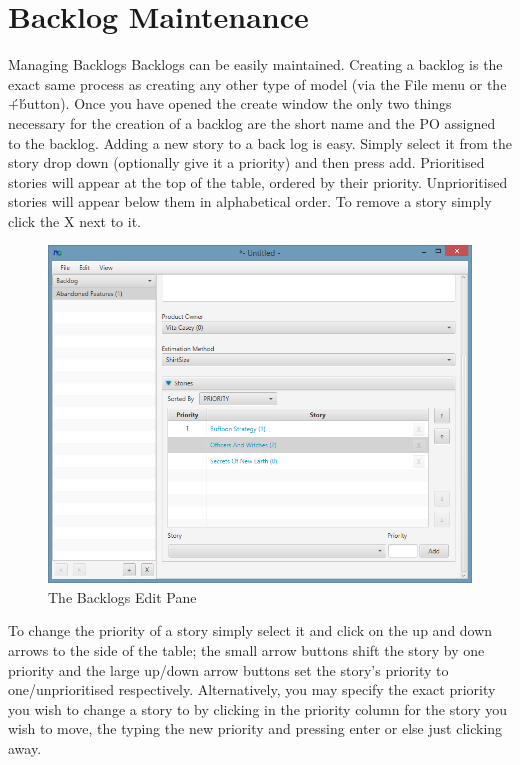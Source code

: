 \section{Backlog Maintenance}

Managing Backlogs
\newline\newline
Backlogs can be easily maintained. Creating a backlog is the exact same process as creating any other type of model (via the File menu or the \'+\' button). Once you have opened the create window the only two things necessary for the creation of a backlog are the short name and the PO assigned to the backlog.
\newline
Adding a new story to a back log is easy. Simply select it from the story drop down (optionally give it a priority) and then press add. Prioritised stories will appear at the top of the table, ordered by their priority. Unprioritised stories will appear below them in alphabetical order. To remove a story simply click the X next to it.

\begin{figure}[H]
\centering
\includegraphics[width=\textwidth]{images/screenshots/backlogs.PNG}
\caption{The Backlogs Edit Pane}
\label{fig:new_project}
\end{figure}

\newline
To change the priority of a story simply select it and click on the up and down arrows to the side of the table; the small arrow buttons shift the story by one priority and the large up/down arrow buttons set the story's priority to one/unprioritised respectively. Alternatively, you may specify the exact priority you wish to change a story to by clicking in the priority column for the story you wish to move, the typing the new priority and pressing enter or else just clicking away.

